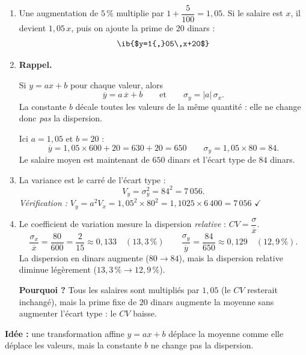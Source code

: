 \begin{enumerate}
  \item Une augmentation de $5\,\%$ multiplie par $1+\dfrac{5}{100}=1{,}05$. Si le salaire est $x$, il devient $1{,}05\,x$, puis on ajoute la prime de $20$ dinars :
  $$ \ib{$y=1{,}05\,x+20$}$$
  \item \textbf{Rappel.}\par
  \begin{prop}
  Si $y=ax+b$ pour chaque valeur, alors
  $$\overline{y}=a\,\overline{x}+b\qquad\text{et}\qquad \sigma_y=|a|\,\sigma_x .$$
  La constante $b$ décale toutes les valeurs de la même quantité : elle ne change donc \emph{pas} la dispersion.
  \end{prop}
  Ici $a=1{,}05$ et $b=20$ :
  $$\overline{y}=1{,}05\times600+20=630+20=650 \qquad \sigma_y=1{,}05\times80=84.$$
  Le salaire moyen est maintenant de $650$ dinars et l'écart type de $84$ dinars.
  \item La variance est le carré de l'écart type :
  $$V_y=\sigma_y^2=84^2=7\,056.$$
  \emph{Vérification :} $V_y=a^2V_x=1{,}05^2\times80^2=1{,}1025\times6\,400=7\,056$ $\checkmark$
  \item Le coefficient de variation mesure la dispersion \emph{relative} : $CV=\dfrac{\sigma}{\overline{x}}$.
  $$\frac{\sigma_x}{\overline{x}}=\frac{80}{600}=\frac{2}{15}\approx0{,}133\quad(13{,}3\,\%)\qquad
  \frac{\sigma_y}{\overline{y}}=\frac{84}{650}\approx0{,}129\quad(12{,}9\,\%).$$
  La dispersion en dinars augmente ($80\to84$), mais la dispersion relative diminue légèrement ($13{,}3\,\%\to12{,}9\,\%$).

  \textbf{Pourquoi ?} Tous les salaires sont multipliés par $1{,}05$ (le $CV$ resterait inchangé), mais la prime fixe de $20$ dinars augmente la moyenne sans augmenter l'écart type : le $CV$ baisse.
\end{enumerate}

\textbf{Idée :} une transformation affine $y=ax+b$ déplace la moyenne comme elle déplace les valeurs, mais la constante $b$ ne change pas la dispersion.
